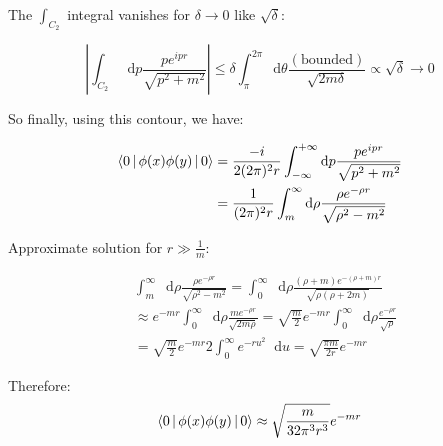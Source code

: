 \documentclass[aspectratio=169]{beamer}
\newcommand{\integrand}{\frac{p e^{ipr}}{\sqrt{p^2 + m^2}}}
\newcommand{\diffop}{\mathop{}\!\mathrm{d}}
\newcommand{\dip}{\diffop p}
\newcommand{\du}{\diffop u}
\newcommand{\drho}{\diffop \rho}
\newcommand{\dtheta}{\diffop \theta}
\newcommand{\phixy}{\Braket{0|\phi(x)\phi(y)|0}}
\newcommand{\intii}{\int_{-\infty}^{+\infty}}
\newcommand{\integral}{\intii \dip \integrand}
\newcommand{\cintegral}{\int_m^\infty \drho \frac{\rho e^{-\rho r}}{\sqrt{\rho^2 - m^2}}}
\begin{document}
\begin{frame}
The $\int_{C_2}$ integral vanishes for $\delta \to 0$ like $\sqrt{\delta}$:

\begin{equation*}
\left| \int_{C_2} \dip \integrand \right| \leq \delta \int_\pi^{2\pi} \dtheta
\frac{(\mathrm{bounded})}{\sqrt{2m\delta}} \propto \sqrt{\delta} \to 0
\end{equation*}

So finally, using this contour, we have:

\begin{equation*}
\begin{split}
\phixy &= \frac{-i}{2(2\pi)^2r} \integral \\
       &= \frac{1}{(2\pi)^2 r} \int_m^\infty \drho \frac{\rho e^{-\rho r}}{\sqrt{\rho^2 - m^2}}
\end{split}
\end{equation*}
\end{frame}


\begin{frame}
Approximate solution for $r \gg \frac{1}{m}$:

\begin{equation*}
\begin{split}
&\cintegral = \int_0^\infty \drho \frac{(\rho + m)e^{-(\rho + m)r}}{\sqrt{\rho(\rho + 2m)}} \\
&\approx e^{-mr} \int_0^\infty \drho \frac{m e^{-\rho r}}{\sqrt{2m\rho}}
= \sqrt{\frac{m}{2}} e^{-mr} \int_0^\infty \drho \frac{e^{-\rho r}}{\sqrt{\rho}} \\
&= \sqrt{\frac{m}{2}} e^{-mr} 2 \int_0^\infty e^{-ru^2} \du = \sqrt{\frac{\pi m}{2r}} e^{-mr}
\end{split}
\end{equation*}

Therefore:
\begin{equation*}
\phixy \approx \sqrt{\frac{m}{32\pi^3 r^3}} e^{-mr}
\end{equation*}

\end{frame}
\end{document}
